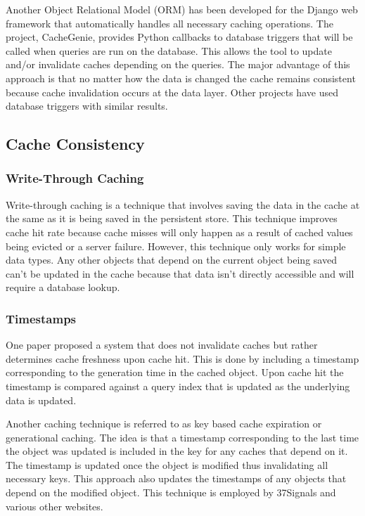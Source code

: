 \documentclass[12pt]{ucthesis}
\begin{document}
Another Object Relational Model (ORM) has been developed for the Django web framework that automatically handles all necessary caching operations.\cite{triggerBasedORM}
The project, CacheGenie, provides Python callbacks to database triggers that will be called when queries are run on the database. This allows the tool to update and/or invalidate caches depending on the queries.
The major advantage of this approach is that no matter how the data is changed the cache remains consistent because cache invalidation occurs at the data layer.
Other projects have used database triggers with similar results.\cite{scalableConsistentCaching}

\subsection{Cache Consistency}
\subsubsection{Write-Through Caching}
Write-through caching is a technique that involves saving the data in the cache at the same as it is being saved in the persistent store.\cite{writeThroughCaching}
This technique improves cache hit rate because cache misses will only happen as a result of cached values being evicted or a server failure.
However, this technique only works for simple data types.
Any other objects that depend on the current object being saved can't be updated in the cache because that data isn't directly accessible and will require a database lookup.

\subsubsection{Timestamps}
One paper proposed a system that does not invalidate caches but rather determines cache freshness upon cache hit.\cite{cacheInvalidationWebSearch}
This is done by including a timestamp corresponding to the generation time in the cached object.
Upon cache hit the timestamp is compared against a query index that is updated as the underlying data is updated.

Another caching technique is referred to as key based cache expiration\cite{keyBasedCacheExpiration} or generational caching\cite{generationalCaching}.
The idea is that a timestamp corresponding to the last time the object was updated is included in the key for any caches that depend on it.
The timestamp is updated once the object is modified thus invalidating all necessary keys.
This approach also updates the timestamps of any objects that depend on the modified object.
This technique is employed by 37Signals and various other websites.\cite{keyBasedCacheExpiration}
\end{document}
